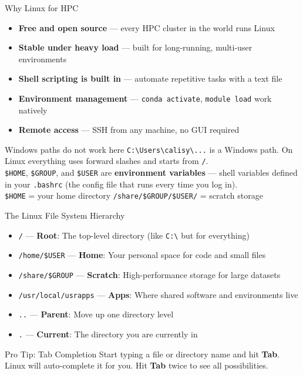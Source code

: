 \documentclass[aspectratio=169, 11pt]{beamer}
\begin{document}
\begin{frame}{Why Linux for HPC}
  \begin{itemize}
    \item \textbf{Free and open source} --- every HPC cluster in the world runs Linux
    \item \textbf{Stable under heavy load} --- built for long-running, multi-user environments
    \item \textbf{Shell scripting is built in} --- automate repetitive tasks with a text file
    \item \textbf{Environment management} --- \texttt{conda activate}, \texttt{module load} work natively
    \item \textbf{Remote access} --- SSH from any machine, no GUI required
  \end{itemize}
  \vspace{0.5em}
  \begin{alertblock}{Windows paths do not work here}
    \texttt{C:\textbackslash{}Users\textbackslash{}calisy\textbackslash{}...} is a Windows path.
    On Linux everything uses forward slashes and starts from \texttt{/}.\\[0.3em]
    \texttt{\$HOME}, \texttt{\$GROUP}, and \texttt{\$USER} are \textbf{environment variables} ---
    shell variables defined in your \texttt{.bashrc} (the config file that runs every time you log in).\\[0.2em]
    \texttt{\$HOME} = your home directory \quad \texttt{/share/\$GROUP/\$USER/} = scratch storage
  \end{alertblock}
\end{frame}%
\begin{frame}{The Linux File System Hierarchy}
  \begin{itemize}
    \item \texttt{/} --- \textbf{Root}: The top-level directory (like \texttt{C:\textbackslash} but for everything)
    \item \texttt{/home/\$USER} --- \textbf{Home}: Your personal space for code and small files
    \item \texttt{/share/\$GROUP} --- \textbf{Scratch}: High-performance storage for large datasets
    \item \texttt{/usr/local/usrapps} --- \textbf{Apps}: Where shared software and environments live
    \item \texttt{..} --- \textbf{Parent}: Move up one directory level
    \item \texttt{.} --- \textbf{Current}: The directory you are currently in
  \end{itemize}
  \vspace{0.5em}
  \begin{block}{Pro Tip: Tab Completion}
    Start typing a file or directory name and hit \textbf{Tab}. 
    Linux will auto-complete it for you. Hit \textbf{Tab} twice to see all possibilities.
  \end{block}
\end{frame}%
\end{document}
